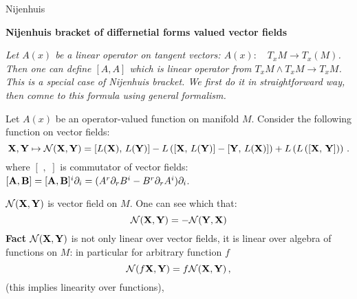 Nijenhuis 

\baselineskip=14pt


\def\vare {\varepsilon}
\def\A {{\bf A}}
\def\B {{\bf B}}
\def\t {\tilde}
\def\a {\alpha}
\def\K {{\bf K}}
\def\N {{\bf N}}
\def\V {{\cal V}}
\def\L {{\cal L}}
\def\s {{\sigma}}
\def\S {{\Sigma}}
\def\s {{\sigma}}
\def\p{\partial}
\def\vare{{\varepsilon}}
\def\Q {{\bf Q}}
\def\O {{\bf O}}
\def\D {{\cal D}}
\def\G {{\Gamma}}
\def\C {{\bf C}}
\def\N {{\cal N}}
\def\Z {{\bf Z}}
\def\U  {{\cal U}}
\def\H {{\cal H}}
\def\R  {{\bf R}}
\def\S  {{\bf S}}
\def\E  {{\bf E}}
\def\l {\lambda}
\def\degree {{\bf {\rm degree}\,\,}}
\def \finish {${\,\,\vrule height1mm depth2mm width 8pt}$}
\def \m {\medskip}
\def\p {\partial}
\def\r {{\bf r}}
\def\v {{\bf v}}
\def\n {{\bf n}}
\def\t {{\bf t}}
\def\b {{\bf b}}
\def\c {{\bf c }}
\def\e{{\bf e}}
\def\ac {{\bf a}}
\def \X   {{\bf X}}
\def \Y   {{\bf Y}}
\def \x   {{\bf x}}
\def \y   {{\bf y}}
\def \G{{\cal G}}
\def\w{\omega}
\def\finish {${\,\,\vrule height1mm depth2mm width 8pt}$}


\centerline {\bf Nijenhuis bracket of differnetial 
     forms valued vector fields}


{\it Let $A(x)$ be a linear operator on tangent vectors: 
$A(x)\colon\quad T_xM\to T_x(M)$. Then one can define $[A,A]$
 which is linear operator from $T_xM\wedge T_x M\to T_xM$. 
This is a special case
of Nijenhuis bracket. We first do it in straightforward way, then
  comne to this formula using general formalism.}

  Let  $A(x)$ be an operator-valued function on manifold $M$. Consider
   the following function on vector fields:
                      $$
    \X,\Y\mapsto
 \N(\X,\Y)=\left[L(\X),\,L(\Y)\right]-
                    L\left(
              \left[\X,\,L(\Y)\right]-\left[\Y,\,L(\X)\right]
                    \right)+
                      L\left(
                    L\left(
              \left[\X,\,\Y\right]
                    \right)
                     \right)\,.
                      $$
where $[\,\,,\,\,]$ is commutator of vector fields:
  $[\A,\B]=[\A,\B]^i\p_i=(A^r\p_r B^i-B^r\p_r A^i)\p_i$.

   $\N(\X,\Y)$ is vector field on $M$.  One can see  which that:
              $$
 \N(\X,\Y)=-\N(\Y,\X)
              $$
 {\bf Fact}   $\N(\X,\Y)$ is not only linear over vector fields, it is
linear over  algebra of functions on $M$:
  in particular for arbitrary function $f$
               $$
\N(f\X,\Y)=f\N(\X,\Y)\,,
               $$
(this implies linearity over functions),

